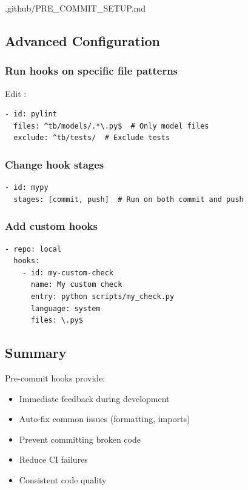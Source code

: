 \begin{relocated}{.github/PRE_COMMIT_SETUP.md}
\subsection{Advanced Configuration}\label{um:flow:pre-commit-setup:advanced-configuration}

\subsubsection{Run hooks on specific file patterns}\label{um:flow:pre-commit-setup:run-hooks-on-specific-file-patterns}

Edit :

\begin{lstlisting}[language={}]
- id: pylint
  files: ^tb/models/.*\.py$  # Only model files
  exclude: ^tb/tests/  # Exclude tests
\end{lstlisting}

\subsubsection{Change hook stages}\label{um:flow:pre-commit-setup:change-hook-stages}

\begin{lstlisting}[language={}]
- id: mypy
  stages: [commit, push]  # Run on both commit and push
\end{lstlisting}

\subsubsection{Add custom hooks}\label{um:flow:pre-commit-setup:add-custom-hooks}

\begin{lstlisting}[language={}]
- repo: local
  hooks:
    - id: my-custom-check
      name: My custom check
      entry: python scripts/my_check.py
      language: system
      files: \.py$
\end{lstlisting}

\subsection{Summary}\label{um:flow:pre-commit-setup:summary}

Pre-commit hooks provide:

\begin{itemize}
\tightlist
\item
  \ok{} Immediate feedback during development
\item
  \ok{} Auto-fix common issues (formatting, imports)
\item
  \ok{} Prevent committing broken code
\item
  \ok{} Reduce CI failures
\item
  \ok{} Consistent code quality
\end{itemize}


\end{relocated}
